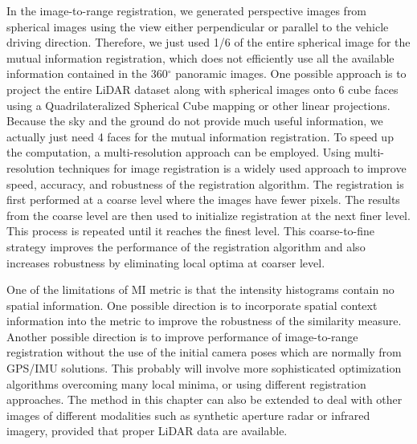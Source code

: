 In the image-to-range registration, we generated perspective images from spherical images using the view either perpendicular or parallel to the vehicle driving direction. Therefore, we just used 1/6 of the entire spherical image for the mutual information registration, which does not efficiently use all the available information contained in the 360$^\circ$ panoramic images. One possible approach is to project the entire LiDAR dataset along with spherical images onto 6 cube faces using a Quadrilateralized Spherical Cube mapping \cite{ChanNeill75} or other linear projections. Because the sky and the ground do not provide much useful information, we actually just need 4 faces for the mutual information registration. To speed up the computation, a multi-resolution approach can be employed. Using multi-resolution techniques for image registration is a widely used approach to improve speed, accuracy, and robustness of the registration algorithm. The registration is first performed at a coarse level where the images have fewer pixels. The results from the coarse level are then used to initialize registration at the next finer level. This process is repeated until it reaches the finest level. This coarse-to-fine strategy improves the performance of the registration algorithm and also increases robustness by eliminating local optima at coarser level. 

One of the limitations of MI metric is that the intensity histograms contain no spatial information. One possible direction is to incorporate spatial context information into the metric to improve the robustness of the similarity measure. Another possible direction is to improve performance of image-to-range registration without the use of the initial camera poses which are normally from GPS/IMU solutions. This probably will involve more sophisticated optimization algorithms overcoming many local minima, or using different registration approaches. The method in this chapter can also be extended to deal with other images of different modalities such as synthetic aperture radar or infrared imagery, provided that proper LiDAR data are available.

